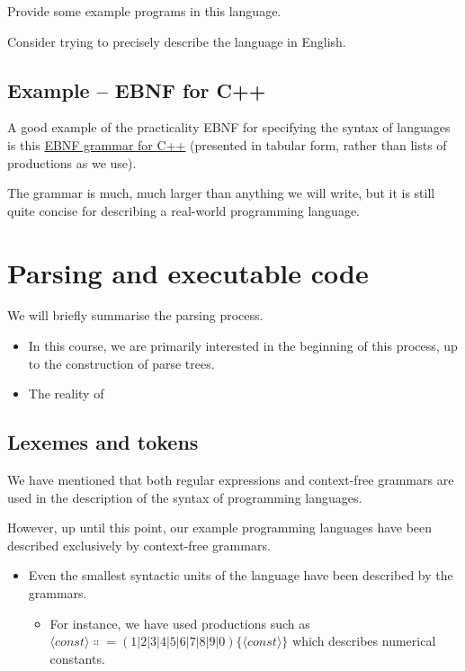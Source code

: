 \documentclass[11pt]{article}
\theoremstyle{definition}
\begin{document}
Provide some example programs in this language.

Consider trying to precisely describe the language in English.

\subsection{Example – EBNF for C++}
\label{sec:org57b0aaa}

A good example of the practicality EBNF for specifying
the syntax of languages is this
\href{http://www.externsoft.ch/download/cpp-iso.html}{EBNF grammar for C++}
(presented in tabular form, rather than lists of productions
as we use).

The grammar is much, much larger than anything we will write,
but it is still quite concise for describing
a real-world programming language.

\section{Parsing and executable code}
\label{sec:orgc19edad}

We will briefly summarise the parsing process.
\begin{itemize}
\item In this course, we are primarily interested in
the beginning of this process, up to the
construction of parse trees.
\item The reality of
\end{itemize}

\subsection{Lexemes and tokens}
\label{sec:org81a5d0c}

We have mentioned that both regular expressions and
context-free grammars are used in the description of
the syntax of programming languages.

However, up until this point,
our example programming languages have been described exclusively
by context-free grammars.
\begin{itemize}
\item Even the smallest syntactic units of the language
have been described by the grammars.
\begin{itemize}
\item For instance, we have used productions such as
\(⟨const⟩  ∷= (1 | 2 | 3 | 4 | 5 | 6 | 7 | 8 | 9 | 0) \{⟨const⟩\}\)
which describes numerical constants.
\end{itemize}
\end{itemize}
\end{document}
